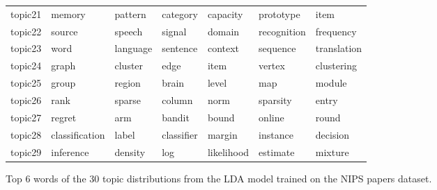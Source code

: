 \documentclass[letterpaper]{article}
\begin{document}
\begin{figure}[ht]
\begin{tabular}{l | l l l l l l}
    topic21 & memory & pattern & category & capacity & prototype & item \\
    topic22 & source & speech & signal & domain & recognition & frequency \\
    topic23 & word & language & sentence & context & sequence & translation \\
    topic24 & graph & cluster & edge & item & vertex & clustering \\
    topic25 & group & region & brain & level & map & module \\
    topic26 & rank & sparse & column & norm & sparsity & entry \\
    topic27 & regret & arm & bandit & bound & online & round \\
    topic28 & classification & label & classifier & margin & instance & decision \\
    topic29 & inference & density & log & likelihood & estimate & mixture \\
  \end{tabular}
  \caption{\label{fig:lda_results} Top 6 words of the 30 topic distributions from the LDA model trained on the NIPS papers dataset.}
\end{figure}
\end{document}
